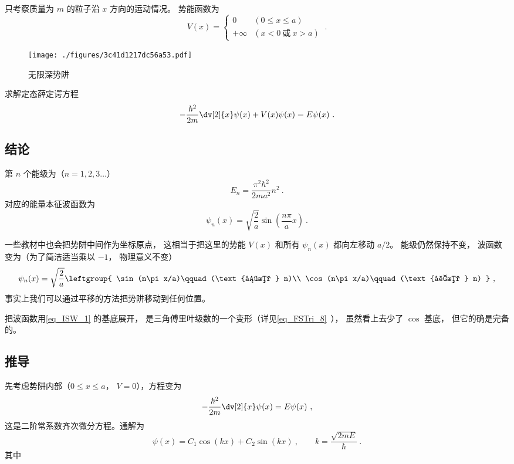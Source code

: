 

只考察质量为 $m$ 的粒子沿 $x$ 方向的运动情况。%
势能函数为
\begin{equation}
V(x) =
\begin{cases}
0 \quad &(0 \leqslant x \leqslant a)\\
+\infty  &(x < 0 \ \text{或}\  x > a)
\end{cases}~.
\end{equation}

\begin{figure}[ht]
\centering
\texttt{[image: ./figures/3c41d1217dc56a53.pdf]}
\caption{无限深势阱} \label{fig_ISW_1}
\end{figure}
求解定态薛定谔方程 %
\begin{equation}
-\frac{\hbar ^2}{2m} \dv[2]{x} \psi(x) + V(x)\psi(x) = E\psi(x)~.
\end{equation} 
\subsection{结论} 

第 $n$ 个能级为（$n = 1,2,3\dots$）
\begin{equation}
E_n = \frac{\pi^2 \hbar^2}{2m a^2} n^2~.
\end{equation}
对应的能量本征波函数为
\begin{equation}\label{eq_ISW_1}
\psi_n(x) = \sqrt{\frac{2}{a}} \sin(\frac{n\pi }{a} x)~.
\end{equation}

一些教材中也会把势阱中间作为坐标原点， 这相当于把这里的势能 $V(x)$ 和所有 $\psi_n(x)$ 都向左移动 $a/2$。 能级仍然保持不变， 波函数变为（为了简洁适当乘以 $-1$， 物理意义不变）
\begin{equation}
\psi_n(x) = \sqrt{\frac{2}{a}}\leftgroup{
    \sin(n\pi x/a)\qquad (\text{偶数 } n)\\
    \cos(n\pi x/a)\qquad (\text{奇数 } n)
}~,
\end{equation}
事实上我们可以通过平移的方法把势阱移动到任何位置。

把波函数用\autoref{eq_ISW_1} 的基底展开， 是三角傅里叶级数的一个变形（详见\autoref{eq_FSTri_8}~）， 虽然看上去少了 $\cos$ 基底， 但它的确是完备的。

\subsection{推导} 
先考虑势阱内部（$0 \leqslant x \leqslant a$， $V = 0$），方程变为
\begin{equation}
-\frac{\hbar^2}{2m} \dv[2]{x} \psi(x) = E\psi(x) ~,
\end{equation}
这是二阶常系数齐次微分方程。通解为
\begin{equation}
\psi(x) = C_1\cos(kx) + C_2 \sin(kx)~, \qquad
k = \frac{\sqrt{2mE}}{\hbar}~.
\end{equation} 
其中


